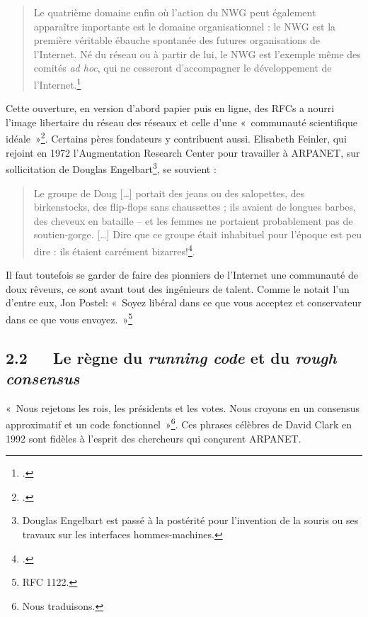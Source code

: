\documentclass{FramateX}
\begin{document}
\begin{refsection}
\begin{quote}
Le quatrième domaine enfin où l'action du NWG peut
également apparaître importante est le domaine organisationnel : le NWG
est la première véritable ébauche spontanée des futures organisations
de l'Internet. Né du réseau ou à partir de lui, le NWG
est l'exemple même des comités \textit{ad hoc}, qui ne
cesseront d'accompagner le développement de
l'Internet.\footnote{\cite[p.~481]{serresaux2000}.}
\end{quote}


Cette ouverture, en version d'abord papier puis en
ligne, des RFCs a nourri l'image libertaire du réseau
des réseaux et celle d'une «~communauté scientifique
idéale~»\footnote{\cite{flichyinternet1999}.}.
Certains pères fondateurs y contribuent aussi. Elisabeth Feinler, qui
rejoint en 1972 l'Augmentation Research Center pour travailler à ARPANET, sur sollicitation de
Douglas Engelbart\footnote{Douglas Engelbart est passé à la postérité
pour l'invention de la souris ou ses travaux sur les
interfaces hommes-machines.}, se souvient :

\begin{quote}
 Le groupe de Doug [\ldots]
portait des jeans ou des salopettes, des birkenstocks, des flip-flops
sans chaussettes ; ils avaient de longues barbes, des cheveux en bataille – et les femmes ne portaient probablement pas de
soutien-gorge. [\ldots] Dire que ce groupe était inhabituel pour
l'époque est peu dire : ils étaient carrément bizarres!\footnote{\cite{feinlernetwork2010}.}.
\end{quote}

Il faut toutefois
se garder de faire des pionniers de l'Internet une
communauté de doux rêveurs, ce sont avant tout des ingénieurs de
talent. Comme le notait l'un d'entre
eux, Jon Postel: «~Soyez libéral dans ce que vous acceptez et
conservateur dans ce que vous envoyez.~»\footnote{RFC 1122.}


\subsection*{2.2~~~Le règne du \textit{running code} et du \textit{ rough consensus}}
{}

«~Nous rejetons les rois, les présidents et les votes. Nous croyons en un consensus approximatif et un code fonctionnel~»\footnote{Nous
traduisons.}. Ces phrases célèbres de David Clark en 1992 sont
fidèles à l'esprit des chercheurs qui conçurent ARPANET.


\end{refsection}
\end{document}
